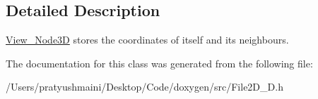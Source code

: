 \subsection{Detailed Description}
\mbox{\hyperlink{class_view___node3_d}{View\+\_\+\+Node3D}} stores the coordinates of itself and its neighbours. 

The documentation for this class was generated from the following file\+:\begin{DoxyCompactItemize}
\item 
/\+Users/pratyushmaini/\+Desktop/\+Code/doxygen/src/File2\+D\+\_\+D.\+h\end{DoxyCompactItemize}
